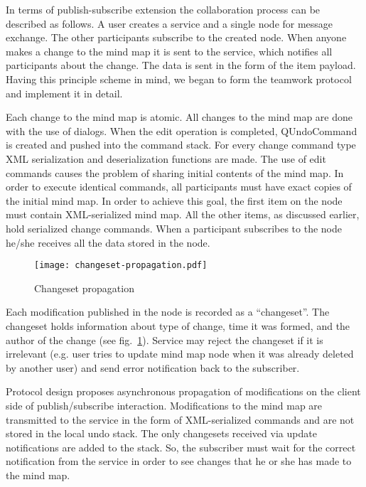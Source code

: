 In terms of publish-subscribe extension the collaboration process can be
described as follows. A user creates a service and a single node for message
exchange. The other participants subscribe to the created node. When anyone
makes a change to the mind map it is sent to the service, which notifies all
participants about the change. The data is sent in the form of the item
payload. Having this principle scheme in mind, we began to form the teamwork
protocol and implement it in detail.

Each change to the mind map is atomic. All changes to the mind map are done with
the use of dialogs. When the edit operation is completed, QUndoCommand is
created and pushed into the command stack. For every change command type XML
serialization and deserialization functions are made.  The use of edit commands
causes the problem of sharing initial contents of the mind map. In order to
execute identical commands, all participants must have exact copies of the
initial mind map. In order to achieve this goal, the first item on the node must
contain XML-serialized mind map. All the other items, as discussed earlier, hold
serialized change commands.  When a participant subscribes to the node he/she
receives all the data stored in the node.


\begin{figure}
\centering
\texttt{[image: changeset-propagation.pdf]}
\caption{Changeset propagation}
\label{Changeset propagation}
\end{figure}

Each modification published in the node is recorded as a ``changeset''. The
changeset holds information about type of change, time it was formed, and the
author of the change (see fig.~\ref{Changeset propagation}). Service may reject
the changeset if it is irrelevant (e.g. user tries to update mind map node when
it was already deleted by another user) and send error notification back to the
subscriber.

Protocol design proposes asynchronous propagation of modifications on the client
side of publish/subscribe interaction. Modifications to the mind map are
transmitted to the service in the form of XML-serialized commands and are not
stored in the local undo stack. The only changesets received via update
notifications are added to the stack. So, the subscriber must wait for the
correct notification from the service in order to see changes that he or she has
made to the mind map.

